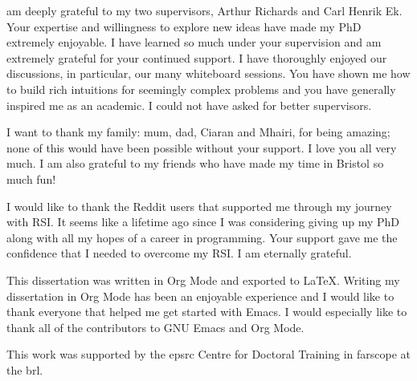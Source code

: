 \documentclass{mimosis-class/mimosis}
\numberwithin{equation}{chapter}
\begin{document}
\label{sec:org7b7bca1}
\begin{singlespace}
 am deeply grateful to my two supervisors, Arthur Richards and Carl Henrik Ek.
Your expertise and willingness to explore new ideas have made my PhD extremely enjoyable.
I have learned so much under your supervision and am extremely grateful for your continued support.
I have thoroughly enjoyed our discussions, in particular, our many whiteboard sessions.
You have shown me how to build rich intuitions for seemingly complex problems
and you have generally inspired me as an academic.
I could not have asked for better supervisors.








I want to thank my family: mum, dad, Ciaran and Mhairi, for being amazing;
none of this would have been possible without your support.
I love you all very much.
I am also grateful to my friends who have made my time in Bristol so much fun!

I would like to thank the Reddit users that supported me through my journey with RSI.
It seems like a lifetime ago since I was considering giving up my PhD along with all my hopes of a career in programming.
Your support gave me the confidence that I needed to overcome my RSI. I am eternally grateful.

This dissertation was written in Org Mode and exported to LaTeX.
Writing my dissertation in Org Mode has been an enjoyable experience and I would like to
thank everyone that helped me get started with Emacs.
I would especially like to thank all of the contributors to GNU Emacs and Org Mode.

This work was supported by the \acrshort{epsrc} Centre for Doctoral Training in \acrfull{farscope} at the \acrfull{brl}.

\end{singlespace}
\end{document}
